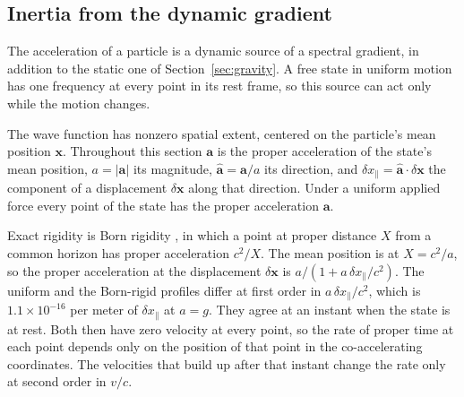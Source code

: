 \documentclass[aps,prd,onecolumn,tightenlines,nofootinbib,notitlepage,11pt,floatfix]{revtex4-2}
\theoremstyle{indentedtheorem}
\begin{document}
\subsection{Inertia from the dynamic gradient}
\label{sec:inertia}

The acceleration of a particle is a dynamic source of a spectral gradient, in addition to the static one of Section~\ref{sec:gravity}. A free state in uniform motion has one frequency at every point in its rest frame, so this source can act only while the motion changes.

The wave function has nonzero spatial extent, centered on the particle's mean position $\mathbf{x}$. Throughout this section $\mathbf{a}$ is the proper acceleration of the state's mean position, $a=|\mathbf{a}|$ its magnitude, $\hat{\mathbf{a}}=\mathbf{a}/a$ its direction, and $\delta x_\parallel=\hat{\mathbf{a}}\cdot\delta\mathbf{x}$ the component of a displacement $\delta\mathbf{x}$ along that direction. Under a uniform applied force every point of the state has the proper acceleration $\mathbf{a}$.

Exact rigidity is Born rigidity \citep{Born1909Theorie,Moller1952Theory,Rindler1966Kruskal}, in which a point at proper distance $X$ from a common horizon has proper acceleration $c^2/X$. The mean position is at $X=c^2/a$, so the proper acceleration at the displacement $\delta\mathbf{x}$ is $a/(1+a \, \delta x_\parallel/c^2)$. The uniform and the Born-rigid profiles differ at first order in $a \, \delta x_\parallel/c^2$, which is $1.1\times10^{-16}$ per meter of $\delta x_\parallel$ at $a=g$. They agree at an instant when the state is at rest. Both then have zero velocity at every point, so the rate of proper time at each point depends only on the position of that point in the co-accelerating coordinates. The velocities that build up after that instant change the rate only at second order in $v/c$.
\end{document}
